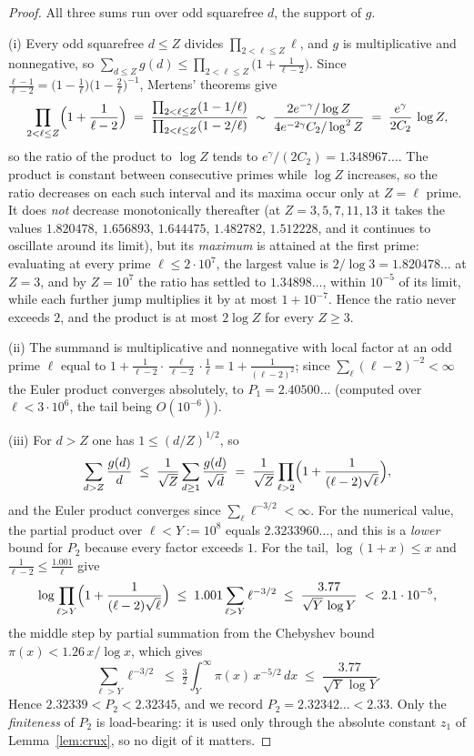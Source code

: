 \documentclass[10pt]{article}
\theoremstyle{definition}
\theoremstyle{remark}
\begin{document}
\begin{proof}
All three sums run over odd squarefree $d$, the support of $g$.

(i) Every odd squarefree $d \le Z$ divides $\prod_{2 < \ell \le Z}\ell$, and
$g$ is multiplicative and nonnegative, so
$\sum_{d \le Z} g(d) \le \prod_{2 < \ell \le Z}\bigl(1+\frac{1}{\ell-2}\bigr)$.
Since $\frac{\ell-1}{\ell-2}
= \bigl(1-\frac1\ell\bigr)\bigl(1-\frac2\ell\bigr)^{-1}$, Mertens' theorems
give
\[
  \prod_{2<\ell\le Z}\Bigl(1+\frac{1}{\ell-2}\Bigr)
  \;=\; \frac{\prod_{2<\ell\le Z}(1-1/\ell)}{\prod_{2<\ell\le Z}(1-2/\ell)}
  \;\sim\; \frac{2e^{-\gamma}/\log Z}{4e^{-2\gamma}C_2/\log^{2}Z}
  \;=\; \frac{e^{\gamma}}{2C_2}\,\log Z,
\]
so the ratio of the product to $\log Z$ tends to $e^{\gamma}/(2C_2)
= 1.348967\ldots$. The product is constant between consecutive primes while
$\log Z$ increases, so the ratio decreases on each such interval and its
maxima occur only at $Z = \ell$ prime. It does \emph{not} decrease
monotonically thereafter (at $Z = 3, 5, 7, 11, 13$ it takes the values
$1.820478$, $1.656893$, $1.644475$, $1.482782$, $1.512228$, and it continues
to oscillate around its limit), but its \emph{maximum} is attained at the
first prime: evaluating at every prime $\ell \le 2\cdot10^{7}$, the largest
value is $2/\log 3 = 1.820478\ldots$ at $Z = 3$, and by $Z = 10^{7}$ the ratio
has settled to $1.34898\ldots$, within $10^{-5}$ of its limit, while each
further jump multiplies it by at most $1 + 10^{-7}$. Hence the ratio never
exceeds $2$, and the product is at most $2\log Z$ for every $Z \ge 3$.

(ii) The summand is multiplicative and nonnegative with local factor at an odd
prime $\ell$ equal to
$1 + \frac{1}{\ell-2}\cdot\frac{\ell}{\ell-2}\cdot\frac{1}{\ell}
 = 1 + \frac{1}{(\ell-2)^{2}}$; since $\sum_{\ell}(\ell-2)^{-2} < \infty$ the
Euler product converges absolutely, to $P_1 = 2.40500\ldots$ (computed over
$\ell < 3\cdot 10^{6}$, the tail being $O(10^{-6})$).

(iii) For $d > Z$ one has $1 \le (d/Z)^{1/2}$, so
\[
  \sum_{d > Z}\frac{g(d)}{d}
  \;\le\; \frac{1}{\sqrt{Z}}\sum_{d \ge 1}\frac{g(d)}{\sqrt{d}}
  \;=\; \frac{1}{\sqrt{Z}}\prod_{\ell>2}
    \Bigl(1 + \frac{1}{(\ell-2)\sqrt{\ell}}\Bigr),
\]
and the Euler product converges since $\sum_\ell \ell^{-3/2} < \infty$. For the
numerical value, the partial product over $\ell < Y := 10^{8}$ equals
$2.3233960\ldots$, and this is a \emph{lower} bound for $P_2$ because every
factor exceeds $1$. For the tail, $\log(1+x) \le x$ and
$\frac{1}{\ell-2} \le \frac{1.001}{\ell}$ give
\[
  \log\prod_{\ell > Y}\Bigl(1 + \frac{1}{(\ell-2)\sqrt\ell}\Bigr)
  \;\le\; 1.001\sum_{\ell > Y} \ell^{-3/2}
  \;\le\; \frac{3.77}{\sqrt{Y}\,\log Y}
  \;<\; 2.1 \cdot 10^{-5},
\]
the middle step by partial summation from the Chebyshev bound
$\pi(x) < 1.26\,x/\log x$, which gives
\[
  \sum_{\ell > Y}\ell^{-3/2}
  \;\le\; \tfrac32\int_Y^{\infty}\pi(x)\,x^{-5/2}\,dx
  \;\le\; \frac{3.77}{\sqrt{Y}\,\log Y}.
\]
Hence $2.32339 < P_2 < 2.32345$, and we record
$P_2 = 2.32342\ldots < 2.33$. Only the \emph{finiteness} of $P_2$ is
load-bearing: it is used only through the absolute constant $z_1$ of
Lemma~\ref{lem:crux}, so no digit of it matters.
\end{proof}
\end{document}
